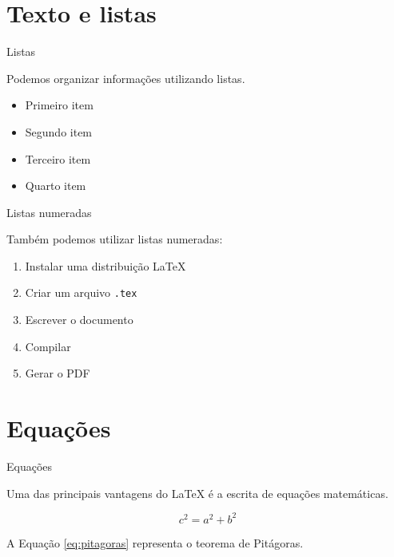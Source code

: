 \documentclass{beamer}
\begin{document}
\section{Texto e listas}

\begin{frame}{Listas}

    Podemos organizar informações utilizando listas.

    \vspace{0.3cm}

    \begin{itemize}
        \item Primeiro item
        \item Segundo item
        \item Terceiro item
        \item Quarto item
    \end{itemize}

\end{frame}


\begin{frame}{Listas numeradas}

    Também podemos utilizar listas numeradas:

    \begin{enumerate}
        \item Instalar uma distribuição LaTeX
        \item Criar um arquivo \texttt{.tex}
        \item Escrever o documento
        \item Compilar
        \item Gerar o PDF
    \end{enumerate}

\end{frame}

\section{Equações}

\begin{frame}{Equações}

    Uma das principais vantagens do LaTeX é a escrita de equações matemáticas.

    \vspace{0.5cm}

    \begin{equation}
        c^2 = a^2 + b^2
        \label{eq:pitagoras}
    \end{equation}

    \vspace{0.4cm}

    A Equação \ref{eq:pitagoras} representa o teorema de Pitágoras.

\end{frame}
\end{document}
